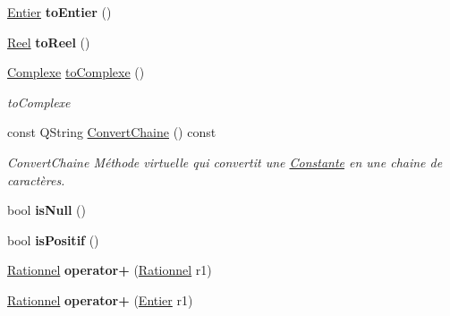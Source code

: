 \begin{DoxyCompactItemize}
\item 
\hypertarget{class_calcul_1_1_rationnel_afa1af66eebf420500eec16e3e8613227}{\hyperlink{class_calcul_1_1_entier}{Entier} {\bfseries to\-Entier} ()}\label{class_calcul_1_1_rationnel_afa1af66eebf420500eec16e3e8613227}

\item 
\hypertarget{class_calcul_1_1_rationnel_a29e6e8102f8484904723a053d334e90d}{\hyperlink{class_calcul_1_1_reel}{Reel} {\bfseries to\-Reel} ()}\label{class_calcul_1_1_rationnel_a29e6e8102f8484904723a053d334e90d}

\item 
\hyperlink{class_calcul_1_1_complexe}{Complexe} \hyperlink{class_calcul_1_1_rationnel_aad6bfa4160014c1ad603373a31383d76}{to\-Complexe} ()
\begin{DoxyCompactList}\small\item\em to\-Complexe \end{DoxyCompactList}\item 
const Q\-String \hyperlink{class_calcul_1_1_rationnel_acfec5903b8b8b5d2b80637a938966ce8}{Convert\-Chaine} () const 
\begin{DoxyCompactList}\small\item\em Convert\-Chaine Méthode virtuelle qui convertit une \hyperlink{class_calcul_1_1_constante}{Constante} en une chaine de caractères. \end{DoxyCompactList}\item 
\hypertarget{class_calcul_1_1_rationnel_a2cd8fe172adde56d15855af2aeb31259}{bool {\bfseries is\-Null} ()}\label{class_calcul_1_1_rationnel_a2cd8fe172adde56d15855af2aeb31259}

\item 
\hypertarget{class_calcul_1_1_rationnel_afbd51679a2eed2444effaee5a548e686}{bool {\bfseries is\-Positif} ()}\label{class_calcul_1_1_rationnel_afbd51679a2eed2444effaee5a548e686}

\item 
\hypertarget{class_calcul_1_1_rationnel_a32fcf45cb9ee316a613b862ff339bf07}{\hyperlink{class_calcul_1_1_rationnel}{Rationnel} {\bfseries operator+} (\hyperlink{class_calcul_1_1_rationnel}{Rationnel} r1)}\label{class_calcul_1_1_rationnel_a32fcf45cb9ee316a613b862ff339bf07}

\item 
\hypertarget{class_calcul_1_1_rationnel_ac6052754e4b2ad3af337f5272a348d6d}{\hyperlink{class_calcul_1_1_rationnel}{Rationnel} {\bfseries operator+} (\hyperlink{class_calcul_1_1_entier}{Entier} r1)}\label{class_calcul_1_1_rationnel_ac6052754e4b2ad3af337f5272a348d6d}


\end{DoxyCompactItemize}
